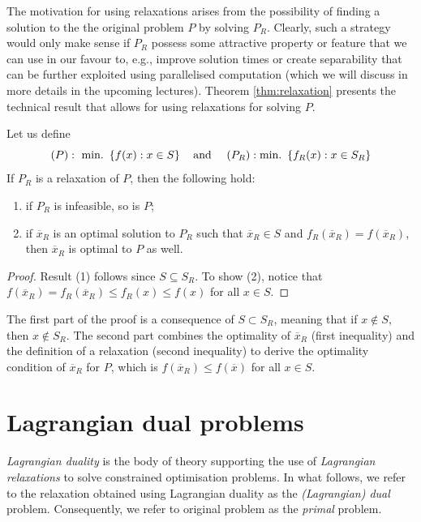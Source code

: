 The motivation for using relaxations arises from the possibility of finding a solution to the  the original problem $P$ by solving $P_R$. Clearly, such a strategy would only make sense if $P_R$ possess some attractive property or feature that we can use in our favour to, e.g., improve solution times or create separability that can be further exploited using parallelised computation (which we will discuss in more details in the upcoming lectures). Theorem \ref{thm:relaxation} presents the technical result that allows for using relaxations for solving $P$.
%
\begin{theorem} \label{thm:relaxation}
	Let us define 
	$$
	(P) :~ \mathop{\text{min.~}} \left\{ f(x) : x \in S \right \} \quad\text{and }\quad (P_R) : \mathop{\text{min.~}} \left\{ f_R(x) : x \in S_R \right \}
	$$
	If $P_R$ is a relaxation of $P$, then the following hold:
	\begin{enumerate}
		\item if $P_R$ is infeasible, so is $P$;
		\item if $\overline{x}_R$ is an optimal solution to $P_R$ such that $\overline{x}_R \in S$ and $f_R(\overline{x}_R) = f(\overline{x}_R)$, then $\overline{x}_R$ is optimal to $P$ as well.
	\end{enumerate}
\end{theorem}
%
\begin{proof}
	Result (1) follows since $S \subseteq S_R$. To show (2), notice that $f(\overline{x}_R) = f_R(\overline{x}_R) \leq  f_R(x) \leq f(x)$ for all $x \in S$.
\end{proof}

The first part of the proof is a consequence of $S \subset S_R$, meaning that if $x \notin S$, then $x \notin S_R$. The second part combines the optimality of $\overline{x}_R$ (first inequality) and the definition of a relaxation (second inequality) to derive the optimality condition of $\overline{x}_R$ for $P$, which is $f(\overline{x}_R) \leq f(\overline{x})$ for all $x \in S$.   


\section{Lagrangian dual problems}


\emph{Lagrangian duality} is the body of theory supporting the use of \emph{Lagrangian relaxations} to solve constrained optimisation problems. In what follows, we refer to the relaxation obtained using Lagrangian duality as the \emph{(Lagrangian) dual} problem. Consequently, we refer to original problem as the \emph{primal} problem.

